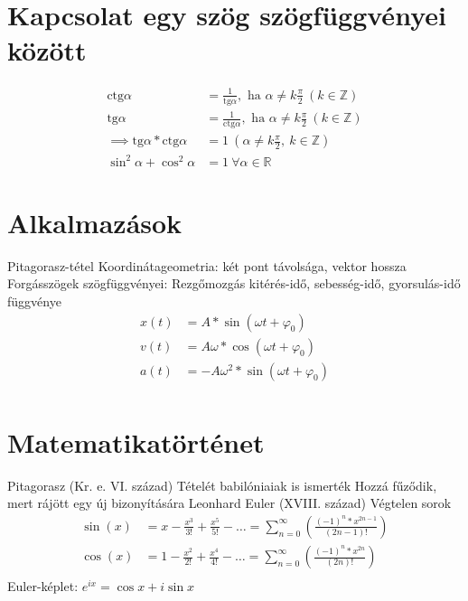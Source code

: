\documentclass[twoside,12pt]{report}
\theoremstyle{definition}
\begin{document}
\section{Kapcsolat egy szög szögfüggvényei között}
	\begin{align*}
		\text{ctg}\alpha&=\frac{1}{\text{tg}\alpha}, \text{ ha }\alpha\ne k\frac{\pi}{2}\ (k\in\mathbb{Z})\\
		\text{tg}\alpha&=\frac{1}{\text{ctg}\alpha}, \text{ ha }\alpha\ne k\frac{\pi}{2}\ (k\in\mathbb{Z})\\
		\implies \text{tg}\alpha*\text{ctg}\alpha&=1\ (\alpha\ne k\frac{\pi}{2},\ k\in\mathbb{Z})\\
		\sin^2\alpha+\cos^2\alpha&=1\ \forall\alpha\in\mathbb{R}
	\end{align*}
\section{Alkalmazások}
	\begin{outline}
		\1 Pitagorasz-tétel
			\2 Koordinátageometria: két pont távolsága, vektor hossza
		\1 Forgásszögek szögfüggvényei:
			\2 Rezgőmozgás kitérés-idő, sebesség-idő, gyorsulás-idő függvénye
			\begin{align*}
				x(t)&=A*\sin(\omega t+\varphi_0)\\
				v(t)&=A\omega*\cos(\omega t+\varphi_0)\\
				a(t)&=-A\omega^2*\sin(\omega t+\varphi_0)\\
			\end{align*}
	\end{outline}
\section{Matematikatörténet}
	\begin{outline}
		\1 Pitagorasz (Kr. e. VI. század)
			\2 Tételét babilóniaiak is ismerték
			\2 Hozzá fűződik, mert rájött egy új bizonyítására
		\1 Leonhard Euler (XVIII. század)
			\2 Végtelen sorok
			\begin{align*}
				\sin(x)&=x-\frac{x^3}{3!}+\frac{x^5}{5!}-\dots=\sum_{n=0}^{\infty} \left(\frac{(-1)^n*x^{2n-1}}{(2n-1)!}\right)\\
				\cos(x)&=1-\frac{x^2}{2!}+\frac{x^4}{4!}-\dots=\sum_{n=0}^{\infty} \left(\frac{(-1)^n*x^{2n}}{(2n)!}\right)\\
			\end{align*}
			\2 Euler-képlet: $e^{ix}=\cos x+i\sin x$
	\end{outline}
\end{document}
